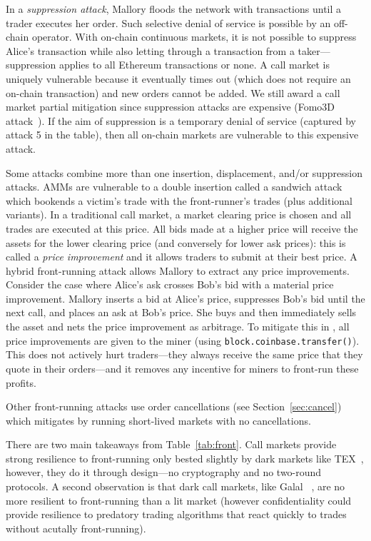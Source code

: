 In a \emph{suppression attack}, Mallory floods the network with transactions until a trader executes her order. Such selective denial of service is possible by an off-chain operator. With on-chain continuous markets, it is not possible to suppress Alice's transaction while also letting through a transaction from a taker---suppression applies to all Ethereum transactions or none. A call market is uniquely vulnerable because it eventually times out (which does not require an on-chain transaction) and new orders cannot be added. We still award a call market partial mitigation since suppression attacks are expensive (\cf Fomo3D attack~\cite{eskandari2019sok}). If the aim of suppression is a temporary denial of service (captured by attack 5 in the table), then all on-chain markets are vulnerable to this expensive attack.

Some attacks combine more than one insertion, displacement, and/or suppression attacks. AMMs are vulnerable to a double insertion called a sandwich attack~\cite{ZQFLG21} which bookends a victim's trade with the front-runner's trades (plus additional variants). In a traditional call market, a market clearing price is chosen and all trades are executed at this price. All bids made at a higher price will receive the assets for the lower clearing price (and conversely for lower ask prices): this is called a \textit{price improvement} and it allows traders to submit at their best price. A hybrid front-running attack allows Mallory to extract any price improvements. Consider the case where Alice's ask crosses Bob's bid with a material price improvement. Mallory inserts a bid at Alice's price, suppresses Bob's bid until the next call, and places an ask at Bob's price. She buys and then immediately sells the asset and nets the price improvement as arbitrage. To mitigate this in \cm, all price improvements are given to the miner (using \texttt{block.coinbase.transfer()}). This does not actively hurt traders---they always receive the same price that they quote in their orders---and it removes any incentive for miners to front-run these profits.

Other front-running attacks use order cancellations (see Section~\ref{sec:cancel}) which \cm mitigates by running short-lived markets with no cancellations.

There are two main takeaways from Table~\ref{tab:front}. Call markets provide strong resilience to front-running only bested slightly by dark markets like TEX~\cite{khalil2019tex}, however, they do it through design---no cryptography and no two-round protocols. A second observation is that dark call markets, like Galal \etal~\cite{galalpublicly}, are no more resilient to front-running than a lit market (however confidentiality could provide resilience to predatory trading algorithms that react quickly to trades without acutally front-running).

